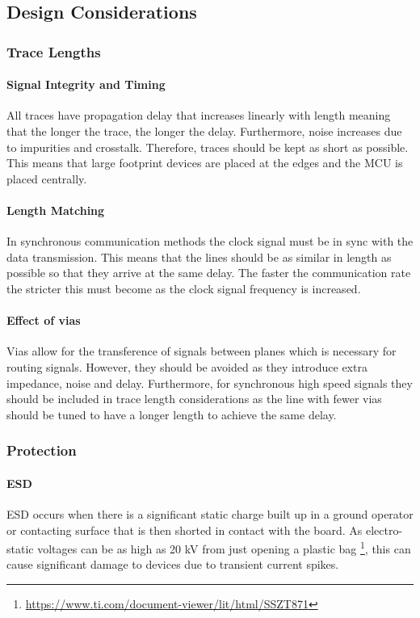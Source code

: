 \subsection{Design Considerations}

\subsubsection{Trace Lengths}
\paragraph{Signal Integrity and Timing}
All traces have propagation delay that increases linearly with length meaning that the longer the trace, the longer the delay. Furthermore, noise increases due to impurities and crosstalk. Therefore, traces should be kept as short as possible. This means that large footprint devices are placed at the edges and the \gls{MCU} is placed centrally.
\paragraph{Length Matching}
In synchronous communication methods the clock signal must be in sync with the data transmission. This means that the lines should be as similar in length as possible so that they arrive at the same delay. The faster the communication rate the stricter this must become as the clock signal frequency is increased.
\paragraph{Effect of vias}
Vias allow for the transference of signals between planes which is necessary for routing signals. However, they should be avoided as they introduce extra impedance, noise and delay. Furthermore, for synchronous high speed signals they should be included in trace length considerations as the line with fewer vias should be tuned to have a longer length to achieve the same delay.

\subsubsection{Protection}
\paragraph{\gls{ESD}}
\gls{ESD} occurs when there is a significant static charge built up in a ground operator or contacting surface that is then shorted in contact with the board. As electro-static voltages can be as high as 20 kV from just opening a plastic bag \footnote{\url{https://www.ti.com/document-viewer/lit/html/SSZT871}}, this can cause significant damage to devices due to transient current spikes.
